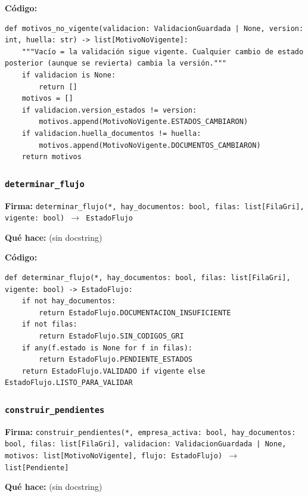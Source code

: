 \documentclass[11pt,a4paper]{article}
\begin{document}
\textbf{Código:}
\begin{lstlisting}
def motivos_no_vigente(validacion: ValidacionGuardada | None, version: int, huella: str) -> list[MotivoNoVigente]:
    """Vacío = la validación sigue vigente. Cualquier cambio de estado posterior (aunque se revierta) cambia la versión."""
    if validacion is None:
        return []
    motivos = []
    if validacion.version_estados != version:
        motivos.append(MotivoNoVigente.ESTADOS_CAMBIARON)
    if validacion.huella_documentos != huella:
        motivos.append(MotivoNoVigente.DOCUMENTOS_CAMBIARON)
    return motivos
\end{lstlisting}

\subsubsection*{\texttt{determinar\_flujo}}
\textbf{Firma:} \texttt{determinar\_flujo(*, hay\_documentos: bool, filas: list[FilaGri], vigente: bool) $\rightarrow$ EstadoFlujo}

\textbf{Qué hace:} (sin docstring)

\textbf{Código:}
\begin{lstlisting}
def determinar_flujo(*, hay_documentos: bool, filas: list[FilaGri], vigente: bool) -> EstadoFlujo:
    if not hay_documentos:
        return EstadoFlujo.DOCUMENTACION_INSUFICIENTE
    if not filas:
        return EstadoFlujo.SIN_CODIGOS_GRI
    if any(f.estado is None for f in filas):
        return EstadoFlujo.PENDIENTE_ESTADOS
    return EstadoFlujo.VALIDADO if vigente else EstadoFlujo.LISTO_PARA_VALIDAR
\end{lstlisting}

\subsubsection*{\texttt{construir\_pendientes}}
\textbf{Firma:} \texttt{construir\_pendientes(*, empresa\_activa: bool, hay\_documentos: bool, filas: list[FilaGri], validacion: ValidacionGuardada | None, motivos: list[MotivoNoVigente], flujo: EstadoFlujo) $\rightarrow$ list[Pendiente]}

\textbf{Qué hace:} (sin docstring)
\end{document}
